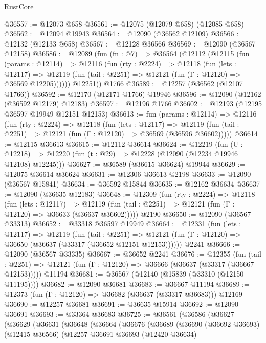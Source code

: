 \begin{lexlean}{RustCore}
\begin{coremodule}
@36557 := @12073 @658
@36561 := @12075 (@12079 @658) (@12085 @658)
@36562 := @12094 @19943
@36564 := @12090 (@36562 @12109)
@36566 := @12132 (@12133 @658)
@36567 := @12128 @36566
@36569 := @12090 (@36567 @12158)
@36586 := @12089
    (fun (fn : @7) =>
    @36564
      (@12112
        (@12115
          (fun (params : @12114) =>
          @12116
            (fun (rty : @2224) =>
            @12118
              (fun (lets : @12117) =>
              @12119 (fun (tail : @2251) => @12121 (fun (Γ : @12120) => @36569 @12205))))))
        @12251))
    @1766
@36589 := @12257 (@36562 (@12107 @1766))
@36592 := @12170 (@12171 @1766) @19946
@36596 := @12090 (@12162 (@36592 @12179) @12183)
@36597 := @12196 @1766
@36602 := @12193 (@12195 @36597 @19949 @12151 @12153)
@36613 := fun (params : @12114) =>
  @12116
    (fun (rty : @2224) =>
    @12118
      (fun (lets : @12117) =>
      @12119 (fun (tail : @2251) => @12121 (fun (Γ : @12120) => @36569 (@36596 @36602)))))
@36614 := @12115 @36613
@36615 := @12112 @36614
@36624 := @12219
    (fun (U : @12218) => @12220 (fun (t : @29) => @12228 (@12090 (@12234 @19946 @12108) @12245)))
@36627 := @36589 (@36615 @36624) @19944
@36629 := @12075 @36614 @36624
@36631 := @12306 @36613 @2198
@36633 := @12090 (@36567 @15841)
@36634 := @36592 @15844
@36635 := @12162 @36634
@36637 := @12090 (@36635 @12183)
@36648 := @12309
    (fun (rty : @2224) =>
    @12118
      (fun (lets : @12117) =>
      @12119 (fun (tail : @2251) => @12121 (fun (Γ : @12120) => @36633 (@36637 @36602)))))
    @2190
@36650 := @12090 (@36567 @33313)
@36652 := @33318 @36597 @19949
@36664 := @12331
    (fun (lets : @12117) =>
    @12119
      (fun (tail : @2251) =>
      @12121 (fun (Γ : @12120) => @36650 (@36637 (@33317 (@36652 @12151 @12153))))))
    @2241
@36666 := @12090 (@36567 @33335)
@36667 := @36652 @2241
@36676 := @12355
    (fun (tail : @2251) => @12121 (fun (Γ : @12120) => @36666 (@36637 (@33317 (@36667 @12153)))))
    @11194
@36681 := @36567 (@12140 (@15839 (@33310 (@12150 @11195))))
@36682 := @12090 @36681
@36683 := @36667 @11194
@36689 := @12373 (fun (Γ : @12120) => @36682 (@36637 (@33317 @36683))) @12169
@36690 := @12257 @36681
@36691 := @36635 @15914
@36692 := @12090 @36691
@36693 := @33364 @36683
@36725 := @36561
    (@36586
      (@36627
        (@36629
          (@36631
            (@36648
              (@36664
                (@36676
                  (@36689
                    (@36690
                      (@36692 @36693)
                      (@12415 @36566)
                      (@12257
                        @36691
                        @36693
                        (@12420 @36634)

\end{coremodule}
\end{lexlean}
